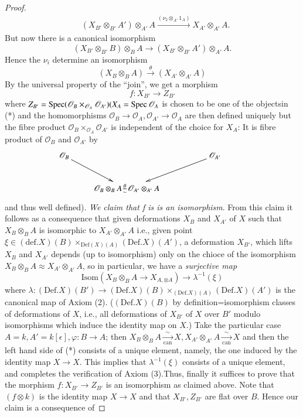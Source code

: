 {\begin{proof}
\begin{align*}
& (X_{B'}\otimes_{B'} A')\otimes_{A'} A\xrightarrow {(\nu_2\otimes_{A'} 1_A)}X_{A'} \otimes_{A'} A.
\end{align*}
But now there is a canonical isomorphism
$$
(X_{B'}\otimes_{B'} B)\otimes_B A\to (X_{B'}\otimes_{B'} A')\otimes_{A'} A.
$$
Hence the $\nu_i$ determine an isomorphism
\begin{equation*}
(X_B \otimes_B A)\xrightarrow{\theta}(X_{A'} \otimes_{A'} A)\tag{*}
\end{equation*}
By the universal property of the ``join'', we get a morphism
$$
f:X_{B'}\to Z_{B'}
$$
where $Z_{B'}=\operatorname{Spec}
(\mathscr{O}_B\times_{\mathscr{O}_{A}}\mathscr{O}_{A'})(X_A=\operatorname{Spec} \mathscr{O}_A$ 
is chosen to be one of the objects\pageoriginale in (*) and the
homomorphisms
$\mathscr{O}_B\to \mathscr{O}_A,\mathscr{O}_{A'}\to \mathscr{O}_{A}$
are then defined uniquely but the fibre product
$\mathscr{O}_B\times_{\mathscr{O}_{A}}\mathscr{O}_{A'}$ is independent
of the choice for $X_A$: It is fibre product of $\mathscr{O}_{B}$ and
$\mathscr{O}_{A'}$ by 
\begin{equation*}
\xymatrix{
\mathscr{O}_B\ar [dr] & & & \mathscr{O}_{A'}\ar [dll]&\\
&\mathscr{O}_B\otimes_B A \frac{\theta}{\sim} \mathscr{O}_{A'} \otimes_{A'}  A&
}
\end{equation*}
and thus well defined). {\em We claim that f is is an
isomorphism}. From this claim it follows as a consequence that given
deformations $X_B$ and $X_{A'}$ of $X$ such that $X_B\otimes_B A$ is
isomorphic to $X_{A'} \otimes_{A'} A$ i.e., given point 
$\xi \in
(\text{def}. X)(B)\times_{\text{Def}(X)(A)}(\text{Def}. X)(A')$, a
deformation $X_{B'}$, which lifts $X_B$ and $X_{A'}$ depends (up to
isomorphism) only on the chioce of the isomorphism $X_B \otimes_B
A \approx X_{A'} \otimes_{A'} A$, so in particular, we have a {\em
surjective map} 
\begin{equation*}
\text{Isom}(X_B\otimes_B A\to X_{A, \otimes A})\to \lambda^{-1}(\xi) \tag{*}
\end{equation*}
where
$\lambda:(\text{Def}. X)(B')\to(\text{Def}. X)(B)\times_{(\text{Def}. X)(A)}(\text{Def}. X)(A')$
is the canonical map of Axiom (2). ($(\text{Def}. X)(B)$ by
definition=isomorphism classes of deformations of $X$, i.e., all
deformations of $X_{B'}$ of $X$ over $B'$ modulo isomorphisms which
induce the identity map on $X$.) Take the particular case $A=k,
A'=k[\epsilon], \varphi:B\to A$; then $X_B\otimes_B
A\xrightarrow[\text{can}]{\sim} X,
X_{A'} \otimes_{A'}A\xrightarrow[\text{can}]{\sim}X $ and then the
left hand side of (*) consists of a unique element, namely, the one
induced by the identity map $X\to X$. This implies that
$\lambda^{-1}(\xi)$ consists of  a unique element, and completes the
verification of Axiom (3).Thus, finally it suffices to prove that the
morphism $f:X_{B'}\to Z_{B'}$ is an isomorphism as claimed above. Note
that\pageoriginale $(f\otimes k)$ is the identity map $X\to X$ and
that $X_{B'}, Z_{B'}$ are flat over $B$. Hence our claim is a
consequence of 
\end{proof}

}
